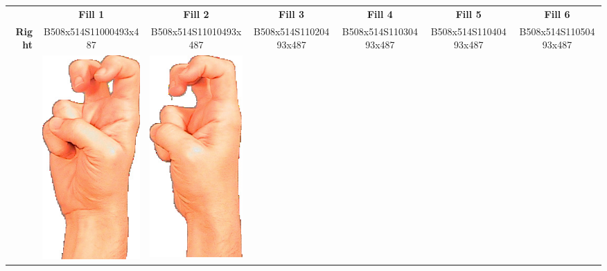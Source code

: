 \documentclass{article}
\begin{document}
\begin{center}
\begin{tabular}{r*{6}{c}}
&\textbf{Fill 1}&\textbf{Fill 2}&\textbf{Fill 3}&\textbf{Fill 4}&\textbf{Fill 5}&\textbf{Fill 6}\\
\multirow{2}{*}{\textbf{Right}}&
B508x514S11000493x487&
B508x514S11010493x487&
B508x514S11020493x487&
B508x514S11030493x487&
B508x514S11040493x487&
B508x514S11050493x487\\
&
\includegraphics[scale=0.1]{images/02-02-1.jpg}&
\includegraphics[scale=0.1]{images/02-02-2.jpg}&

\end{tabular}
\end{center}
\end{document}
